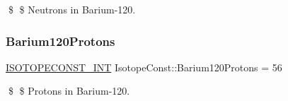 \$ \$ Neutrons in Barium-\/120. \mbox{\label{group___isotope_const-_barium-_ba120_ga72cf39dbd026ba5a0e1f588e14921e9a}} 
\subsubsection{\texorpdfstring{Barium120\+Protons}{Barium120Protons}}
{\footnotesize\ttfamily \mbox{\hyperlink{group___isotope_const-_macros_ga5f18360b3e99483a35c32d789e62621c}{I\+S\+O\+T\+O\+P\+E\+C\+O\+N\+S\+T\+\_\+\+I\+NT}} Isotope\+Const\+::\+Barium120\+Protons = 56}

\$ \$ Protons in Barium-\/120. 
